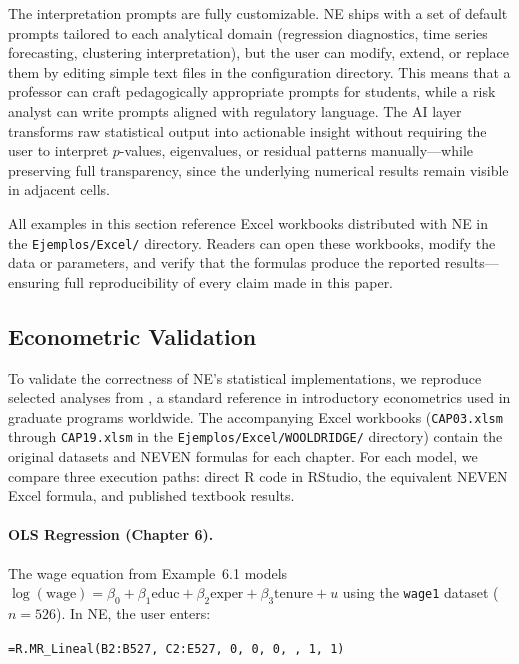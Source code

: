 \documentclass[preprint,12pt,authoryear]{elsarticle}
\newcommand{\neven}{NE\raisebox{0.2ex}{v}\rotatebox[origin=c]{180}{E}\rotatebox[origin=c]{180}{N}}
\begin{document}
The interpretation prompts are fully customizable. \neven{} ships with a set of default prompts tailored to each analytical domain (regression diagnostics, time series forecasting, clustering interpretation), but the user can modify, extend, or replace them by editing simple text files in the configuration directory. This means that a professor can craft pedagogically appropriate prompts for students, while a risk analyst can write prompts aligned with regulatory language. The AI layer transforms raw statistical output into actionable insight without requiring the user to interpret $p$-values, eigenvalues, or residual patterns manually---while preserving full transparency, since the underlying numerical results remain visible in adjacent cells.

All examples in this section reference Excel workbooks distributed with \neven{} in the \texttt{Ejemplos/Excel/} directory. Readers can open these workbooks, modify the data or parameters, and verify that the formulas produce the reported results---ensuring full reproducibility of every claim made in this paper.

\subsection{Econometric Validation}
\label{subsec:econometric}

To validate the correctness of \neven{}'s statistical implementations, we reproduce selected analyses from \citet{Wooldridge2016}, a standard reference in introductory econometrics used in graduate programs worldwide. The accompanying Excel workbooks (\texttt{CAP03.xlsm} through \texttt{CAP19.xlsm} in the \texttt{Ejemplos/Excel/WOOLDRIDGE/} directory) contain the original datasets and NEVEN formulas for each chapter. For each model, we compare three execution paths: direct R code in RStudio, the equivalent NEVEN Excel formula, and published textbook results.

\paragraph{OLS Regression (Chapter 6).}
The wage equation from Example~6.1 models $\log(\text{wage}) = \beta_0 + \beta_1 \text{educ} + \beta_2 \text{exper} + \beta_3 \text{tenure} + u$ using the \texttt{wage1} dataset ($n = 526$). In \neven{}, the user enters:

\begin{center}
\texttt{=R.MR\_Lineal(B2:B527, C2:E527, 0, 0, 0, , 1, 1)}
\end{center}
\end{document}
